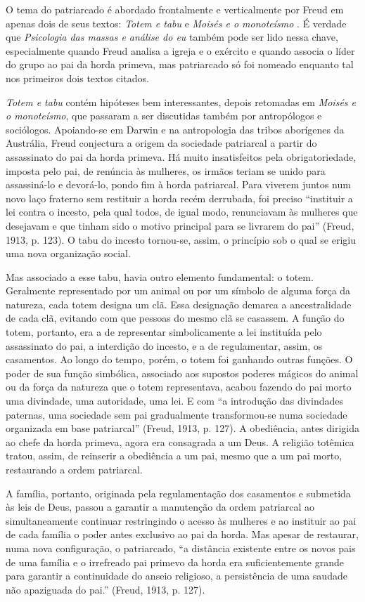 O tema do patriarcado é abordado frontalmente e verticalmente por Freud
em apenas dois de seus textos: \emph{Totem e tabu} e \emph{Moisés e o
monoteísmo} . É verdade que \emph{Psicologia das massas e análise do eu}
também pode ser lido nessa chave, especialmente quando Freud analisa a
igreja e o exército e quando associa o líder do grupo ao pai da horda
primeva, mas patriarcado só foi nomeado enquanto tal nos primeiros dois
textos citados.

\emph{Totem e tabu} contém hipóteses bem interessantes, depois retomadas
em \emph{Moisés e o monoteísmo}, que passaram a ser discutidas também
por antropólogos e sociólogos. Apoiando-se em Darwin e na antropologia
das tribos aborígenes da Austrália, Freud conjectura a origem da
sociedade patriarcal a partir do assassinato do pai da horda primeva. Há
muito insatisfeitos pela obrigatoriedade, imposta pelo pai, de renúncia
às mulheres, os irmãos teriam se unido para assassiná-lo e devorá-lo,
pondo fim à horda patriarcal. Para viverem juntos num novo laço fraterno
sem restituir a horda recém derrubada, foi preciso ``instituir a lei
contra o incesto, pela qual todos, de igual modo, renunciavam às
mulheres que desejavam e que tinham sido o motivo principal para se
livrarem do pai'' (Freud, 1913, p. 123). O tabu do incesto tornou-se,
assim, o princípio sob o qual se erigiu uma nova organização social.

Mas associado a esse tabu, havia outro elemento fundamental: o totem.
Geralmente representado por um animal ou por um símbolo de alguma força
da natureza, cada totem designa um clã. Essa designação demarca a
ancestralidade de cada clã, evitando com que pessoas do mesmo clã se
casassem. A função do totem, portanto, era a de representar
simbolicamente a lei instituída pelo assassinato do pai, a interdição do
incesto, e a de regulamentar, assim, os casamentos. Ao longo do tempo,
porém, o totem foi ganhando outras funções. O poder de sua função
simbólica, associado aos supostos poderes mágicos do animal ou da força
da natureza que o totem representava, acabou fazendo do pai morto uma
divindade, uma autoridade, uma lei. E com ``a introdução das divindades
paternas, uma sociedade sem pai gradualmente transformou-se numa
sociedade organizada em base patriarcal'' (Freud, 1913, p. 127). A
obediência, antes dirigida ao chefe da horda primeva, agora era
consagrada a um Deus. A religião totêmica tratou, assim, de reinserir a
obediência a um pai, mesmo que a um pai morto, restaurando a ordem
patriarcal.

A família, portanto, originada pela regulamentação dos casamentos e
submetida às leis de Deus, passou a garantir a manutenção da ordem
patriarcal ao simultaneamente continuar restringindo o acesso às
mulheres e ao instituir ao pai de cada família o poder antes exclusivo
ao pai da horda. Mas apesar de restaurar, numa nova configuração, o
patriarcado, ``a distância existente entre os novos pais de uma família
e o irrefreado pai primevo da horda era suficientemente grande para
garantir a continuidade do anseio religioso, a persistência de uma
saudade não apaziguada do pai.'' (Freud, 1913, p. 127).

